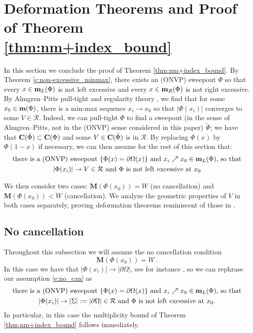 \documentclass[12pt,twoside]{amsart}
\numberwithin{equation}{section}
\newcommand{\C}{{\bf C}}
\renewcommand{\cR}{\mathcal R}
\newcommand{\mm}{{\bf m}}
\newcommand{\bM}{\mathbf{M}}
\begin{document}
\section{Deformation Theorems and Proof of Theorem \ref{thm:nm+index_bound}}\label{ss:deformation_thm}
In this section we conclude the proof of Theorem \ref{thm:nm+index_bound}. By Theorem \ref{c:non-excessive_minmax}, there exists an (ONVP) sweepout $\Phi$ so that every $x \in \mm_L(\Phi)$ is not left excessive and every $x\in\mm_R(\Phi)$ is not right excessive. By Almgren--Pitts pull-tight and regularity theory \cite{Pitts}, we find that for some $x_0\in\mm(\Phi)$, there is a min-max sequence $x_i\to x_0$ so that $|\Phi(x_i)|$ converges to some $V \in \cR$. Indeed, we can pull-tight $\Phi$ to find a sweepout (in the sense of Almgren--Pitts, not in the (ONVP) sense considered in this paper) $\tilde\Phi$; we have that $\C(\tilde\Phi) \subset \C(\Phi)$ and some $V\in\C(\tilde\Phi)$ is in $\cR$. By replacing
$\Phi(x)$ by $\Phi(1-x)$ if necessary,
we can then assume for the rest of this section that:
\begin{equation}\label{e:no_can}
\begin{gathered}
\text{there is a (ONVP) sweepout $\{\Phi(x)=\partial \Omega(x)\}$ and $x_i \nearrow x_0 \in \mm_L(\Phi)$, so that}\\
\text{$|\Phi(x_i)| \to V\in\cR$ and $\Phi$ is not left excessive at $x_0$}
\end{gathered}
\end{equation}

We then consider two cases: $\bM(\Phi(x_0)) = W$ (no cancellation) and $\bM(\Phi(x_0)) < W$ (cancellation). We analyze the geometric properties of $V$ in both cases separately,
proving deformation theorems reminiscent of those in \cite{MN16}. 
	
\subsection{No cancellation} 
Throughout this subsection we will assume the no cancellation condition
\[
\bM(\Phi(x_0)) = W \,.
\] 
In this case we have that $|\Phi(x_i)| \to |\partial \Omega|$, see for instance \cite[Proposition A.1]{DL}, so we can rephrase our assumption \eqref{e:no_can} as
\begin{equation}\label{e:no_canc2}
\begin{gathered}
\text{there is a (ONVP) sweepout $\{\Phi(x)=\partial \Omega(x)\}$ and $x_i \nearrow x_0 \in \mm_L(\Phi)$, so that} \\
\text{$|\Phi(x_i)| \to |\Sigma|:=|\partial \Omega|\in\cR$ and $\Phi$ is not left excessive at $x_0$.}
\end{gathered}
\end{equation}
In particular, in this case the multiplicity bound of Theorem \ref{thm:nm+index_bound} follows immediately.
\end{document}
